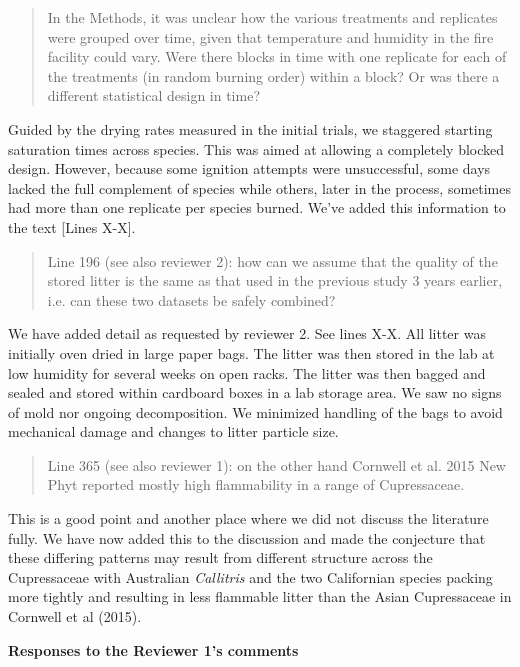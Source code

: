 \documentclass[letterpaper, 12pt]{letter}
\begin{document}
\begin{letter}{}
\begin{quote}
  In the Methods, it was unclear how the various treatments and replicates were
  grouped over time, given that temperature and humidity in the fire facility
  could vary. Were there blocks in time with one replicate for each of the
  treatments (in random burning order) within a block? Or was there a different
  statistical design in time?
\end{quote}

Guided by the drying rates measured in the initial trials, we staggered
starting saturation times across species. This was aimed at allowing a
completely blocked design. However, because some ignition attempts were
unsuccessful, some days lacked the full complement of species while others,
later in the process, sometimes had more than one replicate per species burned.
We've added this information to the text [Lines X-X].

\begin{quote}
  Line 196 (see also reviewer 2): how can we assume that the quality of the
  stored litter is the same as that used in the previous study 3 years earlier,
  i.e. can these two datasets be safely combined?
\end{quote}

We have added detail as requested by reviewer 2. See lines X-X. All litter was
initially oven dried in large paper bags. The litter was then stored in the lab
at low humidity for several weeks on open racks. The litter was then bagged and
sealed and stored within cardboard boxes in a lab storage area. We saw no signs
of mold nor ongoing decomposition. We minimized handling of the bags to avoid
mechanical damage and changes to litter particle size.


\begin{quote}
  Line 365 (see also reviewer 1): on the other hand Cornwell et al. 2015 New
  Phyt reported mostly high flammability in a range of Cupressaceae.
\end{quote}

This is a good point and another place where we did not discuss the literature fully. We
have now added this to the discussion and made the conjecture that these
differing patterns may result from different structure across the
Cupressaceae with Australian \emph{Callitris} and the two Californian species
packing more tightly and resulting in less flammable litter than the Asian
Cupressaceae in Cornwell et al (2015).


{\bf Responses to the Reviewer 1's comments}


\end{letter}
\end{document}
